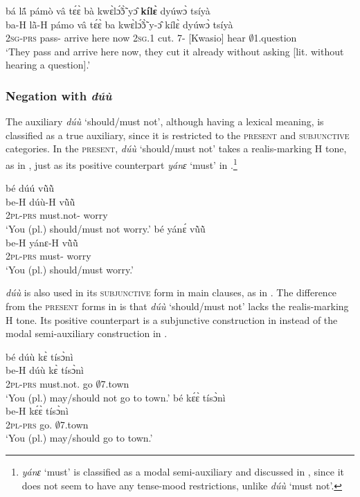 \ea\label{ti6}
  \glll bá lã́ pámò vâ tɛ́ɛ̀ bà kwɛ̀lɔ̃́ɔ̃̀ yɔ̂ {\bfseries kílɛ̀} dyúwɔ̀  tsíyà \\
      ba-H lã̀-H pámo vâ tɛ́ɛ̀ ba kwɛ̀lɔ̃́ɔ̃̀ y-ɔ̂ kílɛ̀ dyúwɔ̀  tsíyà \\
       2\textsc{sg}-\textsc{prs} pass-{\R} arrive here now 2\textsc{sg}.{\PST}1 cut.{\COMPL} 7-{\OBJ} {\NEG}[Kwasio] hear $\emptyset$1.question\\
    \trans `They pass and arrive here now, they cut it already without asking [lit. without hearing a question].'
\z



\subsubsection{Negation with {\itshape dúù}}
\label{sec:NEGduu}

The auxiliary {\itshape dúù} `should/must not', although having a lexical meaning, is classified as a true auxiliary, since it is restricted to the \textsc{present} and \textsc{subjunctive} categories. In the \textsc{present}, {\itshape dúù} `should/must not' takes a realis-marking H tone, as in , just as its positive counterpart {\itshape yánɛ} `must' in .\footnote{{\itshape yánɛ} `must' is classified as a modal semi-auxiliary and discussed in , since it does not seem to have any tense-mood restrictions, unlike {\itshape dúù} `must not'.}


\ea \label{duu1}
\ea \label{duu1a}
  \glll bé dúú vũ̀ũ̀\\
      be-H dúù-H vũ̀ũ̀ \\
        2\textsc{pl}-\textsc{prs} must.not-{\R} worry\\
    \trans `You (pl.) should/must not worry.'
\ex\label{duu1b}
  \glll bé yánɛ́ vũ̀ũ̀ \\
      be-H yánɛ-H vũ̀ũ̀ \\
        2\textsc{pl}-\textsc{prs} must-{\R} worry\\
    \trans `You (pl.) should/must worry.'
\z
\z

{\itshape dúù} is also used in its  \textsc{subjunctive} form in main clauses, as in . The difference from the \textsc{present} forms in  is that {\itshape dúù} `should/must not' lacks the realis-marking H tone. Its positive counterpart is a subjunctive construction in  instead of the modal semi-auxiliary construction in .

\ea \label{duu2}
\ea \label{duu2a}
  \glll bé dúù kɛ̀ tísɔ̀nì \\
      be-H dúù kɛ̀ tísɔ̀nì \\
        2\textsc{pl}-\textsc{prs} must.not.{\SBJV} go $\emptyset$7.town\\
    \trans `You (pl.) may/should not go to town.'
\ex\label{duu2b}
  \glll bé kɛ́ɛ̀ tísɔ̀nì \\
      be-H kɛ́ɛ̀ tísɔ̀nì \\
        2\textsc{pl}-\textsc{prs} go.{\SBJV} $\emptyset$7.town\\
    \trans `You (pl.) may/should go to town.'
\z
\z

